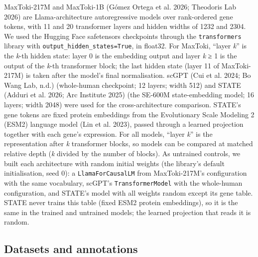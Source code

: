 \documentclass[
  11pt,
]{article}
\begin{document}
MaxToki-217M and MaxToki-1B ({Gómez Ortega et al.} 2026; Theodoris Lab
2026) are Llama-architecture autoregressive models over rank-ordered
gene tokens, with 11 and 20 transformer layers and hidden widths of 1232
and 2304. We used the Hugging Face safetensors checkpoints through the
\texttt{transformers} library with \texttt{output\_hidden\_states=True},
in float32. For MaxToki, ``layer \emph{k}'' is the \emph{k}-th hidden
state: layer 0 is the embedding output and layer \emph{k} ≥ 1 is the
output of the \emph{k}-th transformer block; the last hidden state
(layer 11 of MaxToki-217M) is taken after the model's final
normalisation. scGPT (Cui et al. 2024; Bo Wang Lab, n.d.) (whole-human
checkpoint; 12 layers; width 512) and STATE ({Adduri et al.} 2026; Arc
Institute 2025) (the SE-600M state-embedding model; 16 layers; width
2048) were used for the cross-architecture comparison. STATE's gene
tokens are fixed protein embeddings from the Evolutionary Scale Modeling
2 (ESM2) language model ({Lin et al.} 2023), passed through a learned
projection together with each gene's expression. For all models, ``layer
\emph{k}'' is the representation after \emph{k} transformer blocks, so
models can be compared at matched relative depth (\emph{k} divided by
the number of blocks). As untrained controls, we built each architecture
with random initial weights (the library's default initialisation, seed
0): a \texttt{LlamaForCausalLM} from MaxToki-217M's configuration with
the same vocabulary, scGPT's \texttt{TransformerModel} with the
whole-human configuration, and STATE's model with all weights random
except its gene table. STATE never trains this table (fixed ESM2 protein
embeddings), so it is the same in the trained and untrained models; the
learned projection that reads it is random.

\subsection{Datasets and annotations}\label{datasets-and-annotations}
\end{document}
